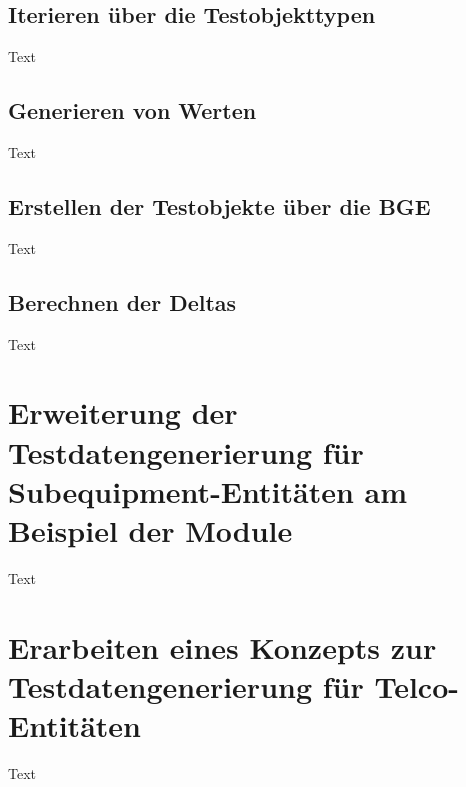 \subsection{Iterieren über die Testobjekttypen}\label{subsec:iterationObjectTypes}
Text

\subsection{Generieren von Werten}\label{subsec:generatingValues}
Text

\subsection{Erstellen der Testobjekte über die BGE}\label{subsec:creatingObjectsBGE}
Text

\subsection{Berechnen der Deltas}\label{subsec:calculatingDeltas}
Text

\section{Erweiterung der Testdatengenerierung für Subequipment-Entitäten am Beispiel der Module}\label{sec:tdgmodule}
Text

\section{Erarbeiten eines Konzepts zur Testdatengenerierung für Telco-Entitäten}\label{sec:tdgtelco}
Text